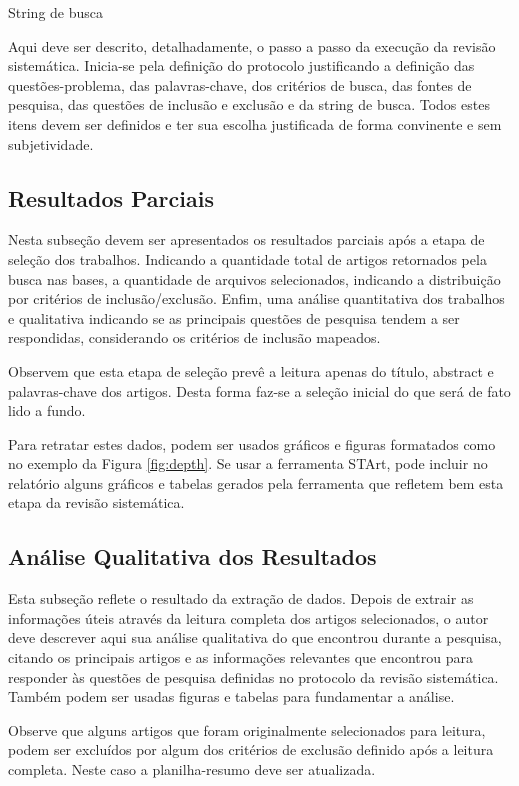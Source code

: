 \documentclass[12pt]{article}
\begin{document}
String de busca


Aqui deve ser descrito, detalhadamente, o passo a passo da execução da revisão sistemática. Inicia-se pela definição do protocolo justificando a definição das questões-problema, das palavras-chave, dos critérios de busca, das fontes de pesquisa, das questões de inclusão e exclusão e da string de busca. Todos estes itens devem ser definidos e ter sua escolha justificada de forma convinente e sem subjetividade.



\subsection{Resultados Parciais}

Nesta subseção devem ser apresentados os resultados parciais após a etapa de seleção dos trabalhos. Indicando a quantidade total de artigos retornados pela busca nas bases, a quantidade de arquivos selecionados, indicando a distribuição por critérios de inclusão/exclusão. Enfim, uma análise quantitativa dos trabalhos e qualitativa indicando se as principais questões de pesquisa tendem a ser respondidas, considerando os critérios de inclusão mapeados. 

Observem que esta etapa de seleção prevê a leitura apenas do título, abstract e palavras-chave dos artigos. Desta forma faz-se a seleção inicial do que será de fato lido a fundo. 

Para retratar estes dados, podem ser usados gráficos e figuras formatados como no exemplo da Figura \ref{fig:depth}. Se usar a ferramenta STArt, pode incluir no relatório alguns gráficos e tabelas gerados pela ferramenta que refletem bem esta etapa da revisão sistemática.

\subsection{Análise Qualitativa dos Resultados}

Esta subseção reflete o resultado da extração de dados. Depois de extrair as informações úteis através da leitura completa dos artigos selecionados, o autor deve descrever aqui sua análise qualitativa do que encontrou durante a pesquisa, citando os principais artigos e as informações relevantes que encontrou para responder às questões de pesquisa definidas no protocolo da revisão sistemática. Também podem ser usadas figuras e tabelas para fundamentar a análise. 

Observe que alguns artigos que foram originalmente selecionados para leitura, podem ser excluídos por algum dos critérios de exclusão definido após a leitura completa. Neste caso a planilha-resumo deve ser atualizada.
\end{document}
